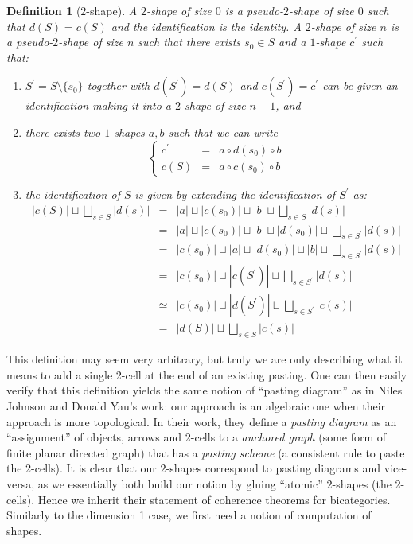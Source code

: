 \documentclass{article}
\numberwithin{equation}{section}
\theoremstyle{definition}
\theoremstyle{plain}
\newtheorem{definition}[equation]{Definition}
\begin{document}
\begin{definition}[$2$-shape] A $2$-shape of size $0$ is a pseudo-$2$-shape of size $0$ such that $d(S)=c(S)$ and the identification is the identity. A $2$-shape of size $n$ is a pseudo-$2$-shape of size $n$ such that there exists $s_0 \in S$ and a $1$-shape $c^{\prime}$ such that:
	\begin{enumerate}[label = $\bullet$]
		\item $S^{\prime} = S\setminus \{s_0\}$ together with $d(S^{\prime}) = d(S)$ and $c(S^{\prime}) = c^{\prime}$ can be given an identification making it into a $2$-shape of size $n-1$, and
		\item there exists two $1$-shapes $a,b$ such that we can write
		\[\left\{\begin{array}{rcl}
			c^{\prime} &=& a \circ d(s_0) \circ b\\
			c(S) &=& a \circ c(s_0) \circ b
		\end{array}\right.\]
		\item the identification of $S$ is given by extending the identification of $S^{\prime}$ as:
		\[\begin{array}{rcl}
			|c(S)|\sqcup \bigsqcup_{s \in S}|d(s)| &=& |a| \sqcup |c(s_0)| \sqcup |b| \sqcup \bigsqcup_{s \in S}|d(s)|\\
			&=& |a| \sqcup |c(s_0)| \sqcup |b| \sqcup |d(s_0)|\sqcup \bigsqcup_{s \in S^{\prime}}|d(s)|\\
			&=& |c(s_0)| \sqcup |a| \sqcup |d(s_0)| \sqcup |b| \sqcup \bigsqcup_{s \in S^{\prime}}|d(s)|\\
			&=& |c(s_0)| \sqcup |c(S^{\prime})| \sqcup \bigsqcup_{s \in S^{\prime}}|d(s)|\\
			&\simeq& |c(s_0)| \sqcup |d(S^{\prime})| \sqcup \bigsqcup_{s \in S^{\prime}}|c(s)|\\
			&=& |d(S)|\sqcup \bigsqcup_{s \in S}|c(s)|
		\end{array}\]
	\end{enumerate}
\end{definition}

This definition may seem very arbitrary, but truly we are only describing what it means to add a single 2-cell at the end of an existing pasting. One can then easily verify that this definition yields the same notion of ``pasting diagram'' as in Niles Johnson and Donald Yau's work: our approach is an algebraic one when their approach is more topological. In their work, they define a \textit{pasting diagram} as an ``assignment'' of objects, arrows and 2-cells to a \textit{anchored graph} (some form of finite planar directed graph) that has a \textit{pasting scheme} (a consistent rule to paste the 2-cells). It is clear that our $2$-shapes correspond to pasting diagrams and vice-versa, as we essentially both build our notion by gluing ``atomic'' $2$-shapes (the 2-cells). Hence we inherit their statement of coherence theorems for bicategories. Similarly to the dimension 1 case, we first need a notion of computation of shapes.
\end{document}
